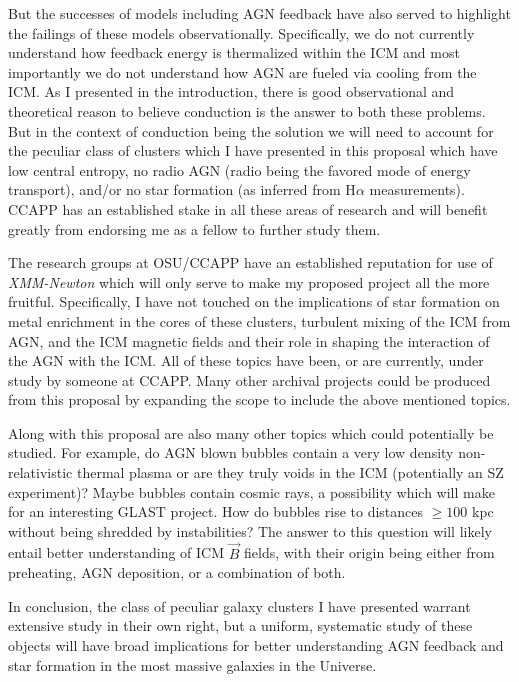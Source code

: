 \documentclass[11pt]{article}
\begin{document}
But the successes of models including AGN feedback have also served to
highlight the failings of these models observationally. Specifically,
we do not currently understand how feedback energy is thermalized
within the ICM and most importantly we do not understand how AGN are
fueled via cooling from the ICM. As I presented in the introduction,
there is good observational and theoretical reason to believe
conduction is the answer to both these problems. But in the context of
conduction being the solution we will need to account for the peculiar
class of clusters which I have presented in this proposal which 
have low central entropy, no radio AGN (radio being the favored
mode of energy transport), and/or no star formation (as inferred from
H${\alpha}$ measurements). CCAPP has an established stake in all these
areas of research and will benefit greatly from endorsing me as a
fellow to further study them.

The research groups at OSU/CCAPP have an established reputation for use of
{\it XMM-Newton} which will only serve to make my proposed project all
the more fruitful. Specifically, I have not touched on the
implications of star formation on metal enrichment in the cores of
these clusters, turbulent mixing of the ICM from AGN, and the
ICM magnetic fields and their role in shaping the interaction of the
AGN with the ICM. All of these topics have been, or are currently,
under study by someone at CCAPP. Many other archival projects could be
produced from this proposal by expanding the scope to include the
above mentioned topics.

Along with this proposal are also many other topics which could
potentially be studied. For example, do AGN blown bubbles contain a very low
density non-relativistic thermal plasma or are they truly voids in the
ICM (potentially an SZ experiment)? Maybe bubbles contain cosmic rays,
a possibility which will make for an interesting GLAST project. How do
bubbles rise to distances $\geq 100$ kpc without being shredded by
instabilities? The answer to this question will likely entail better
understanding of ICM $\vec{B}$ fields, with their origin being either
from preheating, AGN deposition, or a combination of both.

In conclusion, the class of peculiar galaxy clusters I have presented
warrant extensive study in their own right, but a uniform, systematic
study of these objects will have broad implications for better
understanding AGN feedback and star formation in the most massive
galaxies in the Universe.
\end{document}
